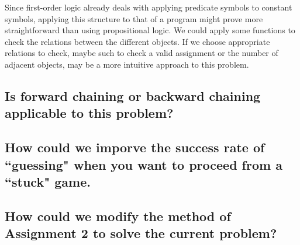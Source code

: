 \documentclass{article}
\begin{document}
		Since first-order logic already deals with applying predicate symbols to constant symbols,
		applying this structure to that of a program might prove more straightforward than using 
		propositional logic. We could apply some functions to check the relations between the different
		objects. If we choose appropriate relations to check, maybe such to check a valid assignment 
		or the number of adjacent objects, may be a more intuitive approach to this problem.
	\subsection{Is forward chaining or backward chaining applicable to this problem?}
	\subsection{How could we imporve the success rate of ``guessing" when you want to proceed from a
			``stuck" game.}
	\subsection{How could we modify the method of Assignment 2 to solve the current problem?}
\end{document}

